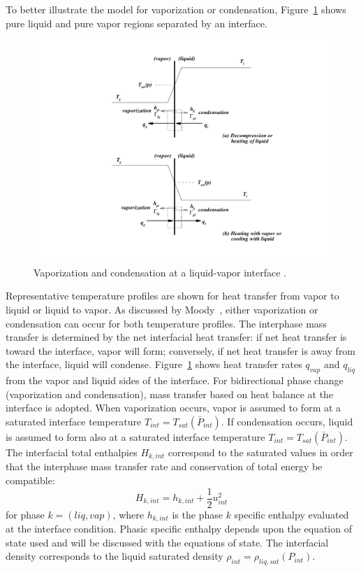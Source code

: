 To better illustrate the model for vaporization or condensation,
Figure~\ref{Berry-Fig:3} shows pure liquid and pure vapor regions
separated by an interface.
\begin{figure}[H]
  \centering
   \includegraphics[clip=true,viewport=200 50 550 500,width=.8\textwidth]{figures/SEM/vaporization_condensation}
   \caption{Vaporization and condensation at a liquid-vapor interface
     \cite{Moody_1990}.\label{Berry-Fig:3}}
\end{figure}
Representative temperature profiles are shown for heat transfer from
vapor to liquid or liquid to vapor.  As discussed by
Moody~\cite{Moody_1990}, either vaporization or condensation can occur
for both temperature profiles. The interphase mass transfer is
determined by the net interfacial heat transfer: if net heat transfer
is toward the interface, vapor will form; conversely, if net heat
transfer is away from the interface, liquid will condense.
Figure~\ref{Berry-Fig:3} shows heat transfer rates $q_{vap}$ and
$q_{liq}$ from the vapor and liquid sides of the interface.  For
bidirectional phase change (vaporization and condensation), mass
transfer based on heat balance at the interface is adopted.  When
vaporization occurs, vapor is assumed to form at a saturated interface
temperature $T_{int}=T_{sat}(\bar{P}_{int})$.  If condensation occurs,
liquid is assumed to form also at a saturated interface temperature
$T_{int}=T_{sat}(\bar{P}_{int})$.  The interfacial total enthalpies $H_{k,int}$
correspond to the saturated values in order that the interphase mass
transfer rate and conservation of total energy be compatible:
\begin{equation}
  \label{E-R:95}
  H_{k,  int} = h_{k,  int} + \frac{1}{2} u_{int}^2
\end{equation}
for phase $k=(liq, vap)$, where $h_{k,int}$ is the phase $k$ specific enthalpy
evaluated at the interface condition.  Phasic specific enthalpy
depends upon the equation of state used and will be discussed with the
equations of state.  The interfacial density corresponds to the liquid
saturated density $\rho_{int} = \rho_{liq, sat}(P_{int})$.

